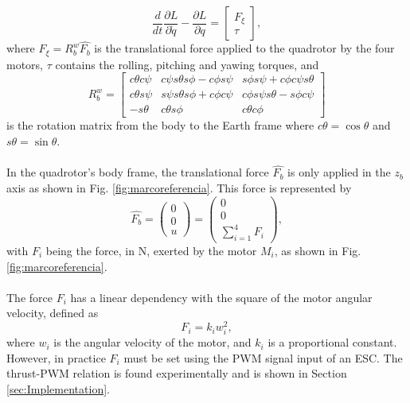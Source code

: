 \begin{equation}
	\dfrac{d}{dt}\dfrac{\partial L}{\partial \dot{q}}-\dfrac{\partial L}{\partial q}=
	\begin{bmatrix}
	F_{\xi}\\
	\tau
	\end{bmatrix},
	\label{ec:eulerlag}
 \end{equation} 
where $F_{\xi}=R_{b}^{w}\hat{F_{b}}$ is the translational force applied to the quadrotor by the four motors, $\tau$ contains the rolling, pitching and yawing torques, and 
\begin{equation}
R_{b}^{w} = \begin{bmatrix}
c\theta c\psi & c\psi s\theta s\phi-c\phi s\psi & s\phi s\psi+c\phi c\psi s\theta\\
c\theta s\psi & s\psi s\theta s\phi+c\phi c\psi & c\phi s\psi s\theta - s\phi c\psi\\
-s\theta & c\theta s\phi & c\theta c\phi
\end{bmatrix}
\end{equation}
is the rotation matrix from the body to the Earth frame where $c\theta = \cos\theta$ and $s\theta = \sin\theta$.
\\\\
In the quadrotor's body frame, the translational force $\hat{F_{b}}$ is only applied in the $z_{b}$ axis as shown in Fig. \ref{fig:marcoreferencia}. This force is represented by
\begin{equation}
	\hat{F_{b}}=\begin{pmatrix}
	0\\
	0\\
	u
	\end{pmatrix} = \begin{pmatrix}
	0\\
	0\\
	\sum_{i=1}^{4}F_{i}
	\end{pmatrix}  ,
 \label{ec:fuerzas}
 \end{equation} 
with $ F_{i} $ being the force, in N, exerted by the motor $ M_{i}$, as shown in Fig. \ref{fig:marcoreferencia}.
\\\\
The force $ F_{i} $ has a linear dependency with the square of the motor angular velocity, defined as
\begin{equation}
	F_{i}=k_{i}w_{i}^{2},
	\label{ec:fi}
\end{equation}
where $ w_{i} $ is the angular velocity of the motor, and $ k_{i} $ is a proportional constant. However, in practice $F_{i}$ must be set using the PWM signal input of an ESC. The thrust-PWM relation is found experimentally and is shown in Section \ref{sec:Implementation}.
